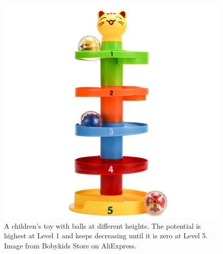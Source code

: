 \begin{figure}
    \centering
    \includegraphics[width=.5\textwidth]{ball_tower.jpg}
    \caption{A children's toy with balls at different heights.
    The potential is highest at Level 1 and keeps decreasing until it is zero at Level 5.
    Image from Bobykids Store on AliExpress.
        \cite{aliexpress}}
    \label{fig:ball_tower}
\end{figure}